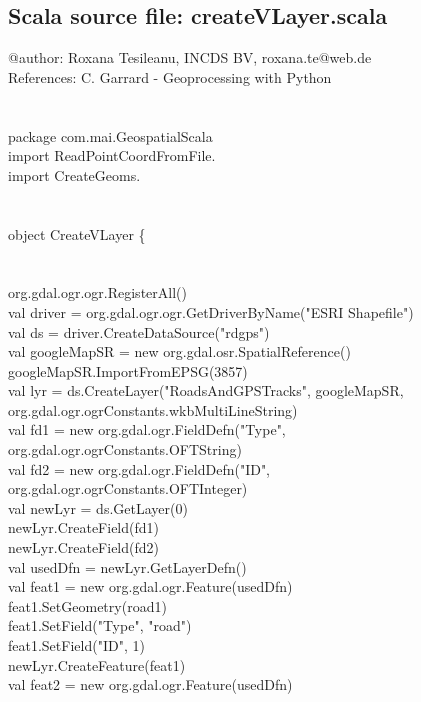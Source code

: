 \documentclass {article}
\begin{document}
\begin{appendices}
\section {Scala source file: createVLayer.scala}

@author: Roxana Tesileanu, INCDS BV, roxana.te@web.de\\
References: C. Garrard - Geoprocessing with Python\\
\\
\\
package com.mai.GeospatialScala\\

import ReadPointCoordFromFile.\underline{\space}\\
import CreateGeoms.\underline{\space}\\
\\
\\
object CreateVLayer \{ \\
\\
\\
org.gdal.ogr.ogr.RegisterAll()\\
val driver = org.gdal.ogr.ogr.GetDriverByName("ESRI Shapefile")\\
val ds = driver.CreateDataSource("rdgps")\\
val googleMapSR = new org.gdal.osr.SpatialReference()\\
googleMapSR.ImportFromEPSG(3857)\\
val lyr = ds.CreateLayer("RoadsAndGPSTracks", googleMapSR, org.gdal.ogr.ogrConstants.wkbMultiLineString)\\
val fd1 = new org.gdal.ogr.FieldDefn("Type", org.gdal.ogr.ogrConstants.OFTString)\\
val fd2 = new org.gdal.ogr.FieldDefn("ID", org.gdal.ogr.ogrConstants.OFTInteger)\\
val newLyr = ds.GetLayer(0)\\
newLyr.CreateField(fd1)\\
newLyr.CreateField(fd2)\\
val usedDfn = newLyr.GetLayerDefn()\\
val feat1 = new org.gdal.ogr.Feature(usedDfn)\\
feat1.SetGeometry(road1)\\
feat1.SetField("Type", "road")\\
feat1.SetField("ID", 1)\\
newLyr.CreateFeature(feat1)\\
val feat2 = new org.gdal.ogr.Feature(usedDfn)\\

\end{appendices}
\end{document}
